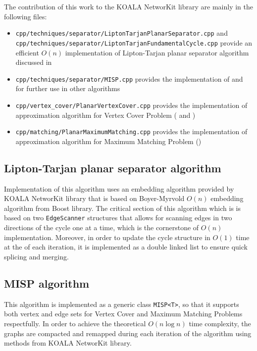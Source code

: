 The contribution of this work to the KOALA NetworKit library are 
mainly in the following files:
\begin{itemize}
    \item \texttt{cpp/techniques/separator/LiptonTarjanPlanarSeparator.cpp}
        and \texttt{cpp/techniques/separator/LiptonTarjanFundamentalCycle.cpp}
        provide an efficient $O(n)$ implementation of Lipton-Tarjan planar 
        separator algorithm discussed in 
    \item \texttt{cpp/techniques/separator/MISP.cpp} provides the implementation 
        of  and  for further use
        in other algorithms
    \item \texttt{cpp/vertex\_cover/PlanarVertexCover.cpp} provides the implementation 
        of approximation algorithm for Vertex Cover Problem ( and )
    \item \texttt{cpp/matching/PlanarMaximumMatching.cpp} provides the implementation of
        approximation algorithm for Maximum Matching Problem ()
\end{itemize}
\subsection{Lipton-Tarjan planar separator algorithm}
Implementation of this algorithm uses an embedding algorithm provided by KOALA NetworKit
library that is based on Boyer-Myrvold $O(n)$ embedding algorithm from Boost \cite{boost} library.
The critical section of this algorithm which is  is based
on two \texttt{EdgeScanner} structures that allows for scanning edges in two directions 
of the cycle one at a time, which is the cornerstone of $O(n)$ implementation. Moreover, 
in order to update the cycle structure in $O(1)$ time at the of each iteration, it is 
implemented as a double linked list to ensure quick splicing and merging.

\subsection{\textsc{MISP} algorithm}
This algorithm is implemented as a generic class \texttt{MISP<T>}, so that it supports both 
vertex and edge sets for Vertex Cover and Maximum Matching Problems respectfully. In order to 
achieve the theoretical $O(n\log n)$ time complexity, the graphs are compacted and remapped 
during each iteration of the algorithm using methods from KOALA NetworKit library.

